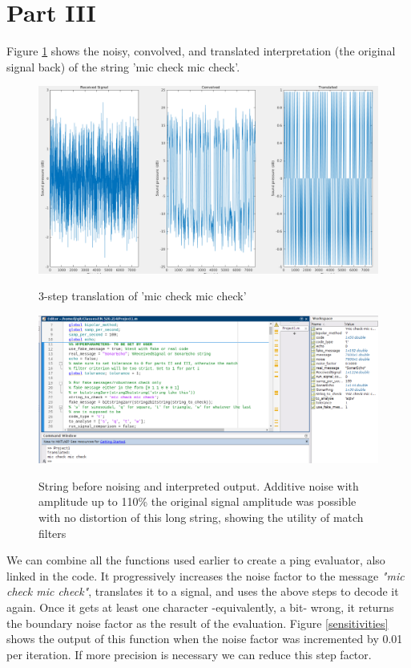\documentclass{article}
\begin{document}
\section{Part III}
Figure \ref{miccheck} shows the noisy, convolved, and translated interpretation (the original signal back) of the string 'mic check mic check'.
\begin{figure}[h]
	\includegraphics[width =\textwidth]{miccheck.png}
	\label{miccheck}
	\caption{3-step translation of 'mic check mic check'}
\end{figure}
\begin{figure}[h]
	\includegraphics[width =\textwidth]{output.png}
	\label{output}
	\caption{String before noising and interpreted output. Additive noise with amplitude up to 110\% the original signal amplitude was possible with no distortion of this long string, showing the utility of match filters}
\end{figure}


We can combine all the functions used earlier to create a ping evaluator, also linked in the code.
It progressively increases the noise factor to the message \emph{"mic check mic check"}, translates it to a signal, and uses the above steps to decode it again. Once it gets at least one character -equivalently, a bit- wrong, it returns the boundary noise factor as the result of the evaluation.
Figure \ref{sensitivities} shows the output of this function when the noise factor was incremented by 0.01 per iteration. If more precision is necessary we can reduce this step factor.
\end{document}
